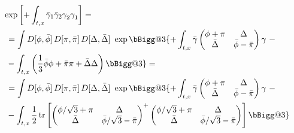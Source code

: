 \documentclass[a4paper,11pt, english]{article}
\makeatletter
\DeclareMathOperator{\tr}{tr}
\theoremstyle{remark}
\newcommand{\ro}{\rho}
\newcommand{\vast}{\bBigg@{3}}
\newcommand{\gammabar}{\bar{\gamma}}
\makeatother
\begin{document}
\begin{subequations}
\begin{align}
&\begin{aligned}
 &\exp\left[+\int_{t,x}\bar{\gamma}_1\bar{\gamma}_2\gamma^{ }_2\gamma_1^{ }\right] = \\
 &\ =  \int D[\phi,\bar{\phi}]\,D[\pi,\bar\pi]\, D[\Delta,\bar{\Delta}] \ \exp\vast\{+\int_{t,x}\gammabar 
 \begin{pmatrix}
 \phi+\pi & \Delta \\
 \bar{\Delta} & \bar{\phi}-\bar{\pi}
 \end{pmatrix}
 \gamma\ -\\
 &\ - \int_{t,x}\left(\frac{1}{3}\bar\phi\phi + \bar\pi\pi + \bar\Delta\Delta\right)\vast\} = \\
 &\ =  \int D[\phi,\bar{\phi}]\,D[\pi,\bar\pi]\, D[\Delta,\bar{\Delta}] \ \exp\vast\{+\int_{t,x}\gammabar 
 \begin{pmatrix}
 \phi+\pi & \Delta \\
 \bar{\Delta} & \bar{\phi}-\bar{\pi}
 \end{pmatrix}
 \gamma\ -\\
 &\ - \int_{t,x}\frac{1}{2}\tr\left[
 \begin{pmatrix}
 \phi/\sqrt{3} + \pi & \Delta \\
 \bar{\Delta} & \bar{\phi}/\sqrt{3} - \bar\pi
 \end{pmatrix}^{+}
 \begin{pmatrix}
 \phi/\sqrt{3}  + \pi & \Delta \\
 \bar{\Delta} & \bar{\phi}/\sqrt{3} - \bar\pi
 \end{pmatrix}
 \right]
\vast\}
\end{aligned}\label{eq:mHS_matrixHubStrat_ComplexAsymmetric}

\end{align}
\end{subequations}
\end{document}
